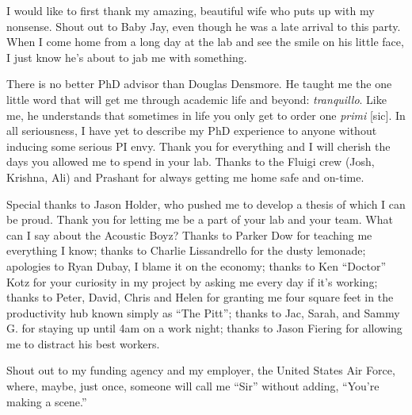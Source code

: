 I would like to first thank my amazing, beautiful wife who puts up with my nonsense. Shout out to Baby Jay, even though he was a late arrival to this party. When I come home from a long day at the lab and see the smile on his little face, I just know he's about to jab me with something.

There is no better PhD advisor than Douglas Densmore. He taught me the one little word that will get me through academic life and beyond: \emph{tranquillo}. Like me, he understands that sometimes in life you only get to order one \emph{primi} [sic]. In all seriousness, I have yet to describe my PhD experience to anyone without inducing some serious PI envy. Thank you for everything and I will cherish the days you allowed me to spend in your lab. Thanks to the Fluigi crew (Josh, Krishna, Ali) and Prashant for always getting me home safe and on-time.

Special thanks to Jason Holder, who pushed me to develop a thesis of which I can be proud. Thank you for letting me be a part of your lab and your team. What can I say about the Acoustic Boyz? Thanks to Parker Dow for teaching me everything I know; thanks to Charlie Lissandrello for the dusty lemonade; apologies to Ryan Dubay, I blame it on the economy; thanks to Ken ``Doctor'' Kotz for your curiosity in my project by asking me every day if it's working; thanks to Peter, David, Chris and Helen for granting me four square feet in the productivity hub known simply as ``The Pitt''; thanks to Jac, Sarah, and Sammy G. for staying up until 4am on a work night; thanks to Jason Fiering for allowing me to distract his best workers.


Shout out to my funding agency and my employer, the United States Air Force, where, maybe, just once, someone will call me ``Sir'' without adding, ``You're making a scene.''
